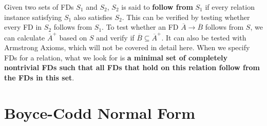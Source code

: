 Given two sets of FDs $S_1$ and $S_2$, $S_2$ is said to \textbf{follow from} $S_1$ if every relation instance satisfying $S_1$ also satisfies $S_2$. This can be verified by testing whether every FD in $S_2$ follows from $S_1$. To test whether an FD $\overline{A}\rightarrow\overline{B}$ follows from $S$, we can calculate $\overline{A}^+$ based on $S$ and verify if $\overline{B}\subseteq\overline{A}^+$. It can also be tested with Armstrong Axioms, which will not be covered in detail here. When we specify FDs for a relation, what we look for is \textbf{a minimal set of completely nontrivial FDs such that all FDs that hold on this relation follow from the FDs in this set}.
\section{Boyce-Codd Normal Form}
\ifx\PREAMBLE\undefined

\fi
